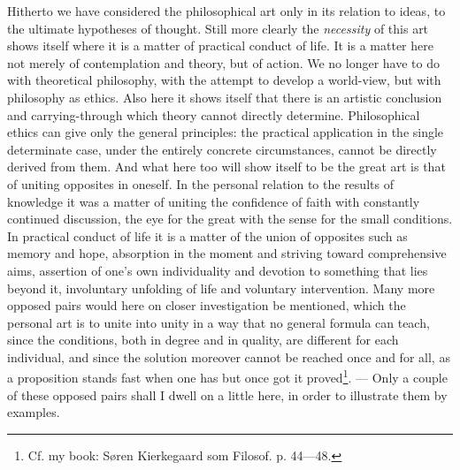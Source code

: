 \documentclass[12pt,a4paper,openany]{book}
\begin{document}
Hitherto we have considered the philosophical art only in its
relation to ideas, to the ultimate hypotheses of thought. Still
more clearly the \emph{necessity} of this art shows itself where it is
a matter of practical conduct of life. It is a matter here not merely of
contemplation and theory, but of action. We no longer have
to do with theoretical philosophy, with the attempt to
develop a world-view, but with philosophy as ethics.
Also here it shows itself that there is an artistic conclusion
and carrying-through which theory cannot directly determine.
Philosophical ethics can give only the general principles:
the practical application in the single determinate case,
under the entirely concrete circumstances, cannot be directly derived
from them. And what here too will show itself to be
the great art is that of uniting opposites in oneself. In the
personal relation to the results of knowledge it was a matter of
uniting the confidence of faith with constantly continued discussion, the eye
for the great with the sense for the small conditions. In
practical conduct of life it is a matter of the union of
opposites such as memory and hope, absorption in the moment and striving
toward comprehensive aims, assertion of one's own individuality
and devotion to something that lies beyond it,
involuntary unfolding of life and voluntary intervention. Many more
opposed pairs would here on closer investigation
be mentioned, which the personal art is to unite into
unity in a way that no general formula can teach,
since the conditions, both in degree and in quality, are different for
each individual, and since the solution moreover
cannot be reached once and for all, as a proposition stands
fast when one has but once got it proved\footnote{Cf. my book: Søren Kierkegaard som Filosof. p. 44---48.}. --- Only
a couple of these opposed pairs shall I dwell on a little here,
in order to illustrate them by examples.
\end{document}
